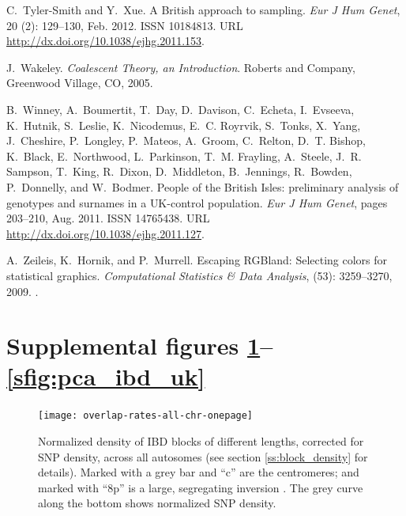 \documentclass{article}
\begin{document}
\begin{thebibliography}{76}
C.~Tyler-Smith and Y.~Xue.
\newblock A {British} approach to sampling.
\newblock \emph{Eur J Hum Genet}, 20 (2): 129--130, Feb.
  2012.
\newblock ISSN 10184813.
\newblock URL \url{http://dx.doi.org/10.1038/ejhg.2011.153}.

J.~Wakeley.
\newblock \emph{Coalescent Theory, an Introduction}.
\newblock Roberts and Company, Greenwood Village, CO, 2005.

B.~Winney, A.~Boumertit, T.~Day, D.~Davison, C.~Echeta, I.~Evseeva, K.~Hutnik,
  S.~Leslie, K.~Nicodemus, E.~C. Royrvik, S.~Tonks, X.~Yang, J.~Cheshire,
  P.~Longley, P.~Mateos, A.~Groom, C.~Relton, D.~T. Bishop, K.~Black,
  E.~Northwood, L.~Parkinson, T.~M. Frayling, A.~Steele, J.~R. Sampson,
  T.~King, R.~Dixon, D.~Middleton, B.~Jennings, R.~Bowden, P.~Donnelly, and
  W.~Bodmer.
\newblock People of the {British Isles}: preliminary analysis of genotypes and
  surnames in a {UK-control} population.
\newblock \emph{Eur J Hum Genet}, pages 203--210, Aug. 2011.
\newblock ISSN 14765438.
\newblock URL \url{http://dx.doi.org/10.1038/ejhg.2011.127}.

A.~Zeileis, K.~Hornik, and P.~Murrell.
\newblock Escaping {RGBland}: Selecting colors for statistical graphics.
\newblock \emph{Computational Statistics \& Data Analysis}, 
  (53): 3259--3270, 2009.
\newblock {}.

\end{thebibliography}
\clearpage


\section*{Supplemental figures \ref{sfig:overlap_all}--\ref{sfig:pca_ibd_uk}}


\renewcommand{\thefigure}{S\arabic{figure}}
\setcounter{figure}{0}
\renewcommand{\thetable}{S\arabic{table}}
\setcounter{table}{0}


\begin{figure}[!htp]
  \begin{center}
    \texttt{[image: overlap-rates-all-chr-onepage]}
    \caption{
       Normalized density of IBD blocks of different lengths, corrected for SNP density, across all autosomes
       (see section \ref{ss:block_density} for details).
       Marked with a grey bar and ``c'' are the centromeres; 
       and marked with ``8p'' is a large, segregating inversion \citep{giglio2001olfactory}.
       The grey curve along the bottom shows normalized SNP density. 
      \label{sfig:overlap_all}
    }
  \end{center}
\end{figure}
\end{document}
